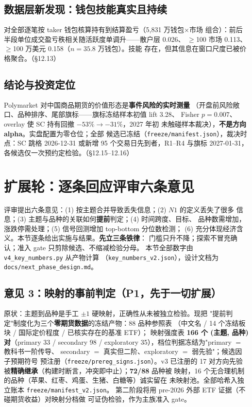 \documentclass[11pt, a4paper]{ctexart}
\newcommand{\code}[1]{\texttt{\small #1}}
\begin{document}
\subsection{数据层新发现：钱包技能真实且持续}

对全部逐笔按 taker 钱包核算持有到结算盈亏（5{,}831 万钱包$\times$市场
组合）：前后半段单位成交盈亏秩相关随活跃度单调升——散户层 0.026、
$\ge$100 市场 0.113、$\ge$100 万美元 0.158（$n=35.8$ 万钱包）。技能
存在，但其信息在窗口尺度已被价格聚合。（§12.13）

\subsection{结论与投资定位}

Polymarket 对中国商品期货的价值形态是\textbf{事件风险的实时测量}
（开盘前风险敞口、品种排序、尾部旗标——旗标冻结样本初值 lift 3.28、
Fisher $p=0.007$、overlay 使 SC 持有回撤 $-53\%\to-31\%$，2027 年初
未触碰样本裁决），\textbf{不是方向 alpha}。实盘配置为零仓位；全部
候选已冻结（\code{freeze/manifest.json}），裁决时点：SC 跳格
2026-12-31 或新增 95 个交易日先到者，R1--R4 与旗标 2027-01-31，
各候选仅一次预约定检验。（§12.15--12.16）

\section{扩展轮：逐条回应评审六条意见}\label{sec:ext}

评审提出六条意见：(1) 按主题合并导致丢失信息；(2) $N1$ 的定义丢失了很多
信息；(3) 主题与品种的关联如何\textbf{提前}判定；(4) 时间跨度、目标、
品种数需增加，涨跌停需处理；(5) 信号回测增加 top-bottom 分位数检测；
(6) 充分体现经济含义。本节逐条给出实施与结果。\textbf{先立三条铁律}：
门槛只升不降；探索不冒充确认；准入 gate 只剪除候选、不缩减检验分母。
本节全部数字由 \code{v4\_key\_numbers.py} 从产物计算
（\code{key\_numbers\_v2.json}），设计文档为
\code{docs/next\_phase\_design.md}。

\subsection{意见 3：映射的事前判定（P1，先于一切扩展）}

原状：主题到品种是手工 $\pm1$ 硬映射，正确性从未被独立检验。现把
"提前判定"制度化为三个\textbf{零期货数据}的冻结产物：88 品种参照表
（中文名 / 14 个冻结板块 / 国际定价程度 / 已核实存在的基准 ETF）；
映射强度表 \textbf{166 个 (主题, 品种) 对}（primary 33 / secondary 98 /
exploratory 35），档位判据冻结为"primary $=$ 教科书一阶传导、
secondary $=$ 真实但二阶、exploratory $=$ 弱先验"；候选因子预期符号
预注册（\code{freeze/prereg\_signs.json}）。v3 已注册的 17 对方向先验
被\textbf{精确继承}（构建时断言，冲突即中止）；\textbf{72/88} 品种被
映射，16 个无合理机制的品种（苹果、红枣、鸡蛋、生猪、白糖等）诚实留在
未映射池。全部哈希入独立账本 \code{freeze/manifest\_v2.json}。
第二阶段将用 pre-2026 外部 ETF 证据（不碰期货收益）对映射分档做
可证伪检验，作为主族准入 gate。
\end{document}
